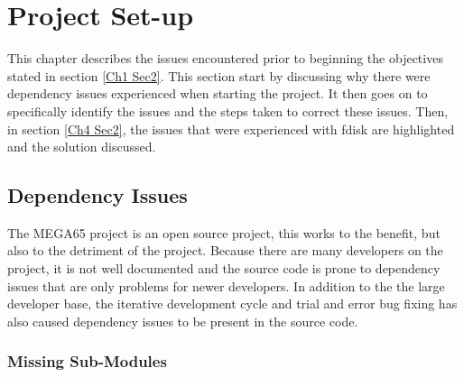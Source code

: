 
\chapter{Project Set-up} %

\label{Chapter 4} %

This chapter describes the issues encountered prior to beginning the objectives stated in section \ref{Ch1 Sec2}. This section start by discussing why there were dependency issues experienced when starting the project. It then goes on to specifically identify the issues and the steps taken to correct these issues. Then, in section \ref{Ch4 Sec2}, the issues that were experienced with fdisk are highlighted and the solution discussed. 


\section{Dependency Issues}

\label{Ch4 Sec1}

The MEGA65 project is an open source project, this works to the benefit, but also to the detriment of the project. Because there are many developers on the project, it is not well documented and the source code is prone to dependency issues that are only problems for newer developers. In addition to the the large developer base, the iterative development cycle and trial and error bug fixing has also caused dependency issues to be present in the source code.

\subsection{Missing Sub-Modules}

\label{Ch4 Sec1 Sub1}

